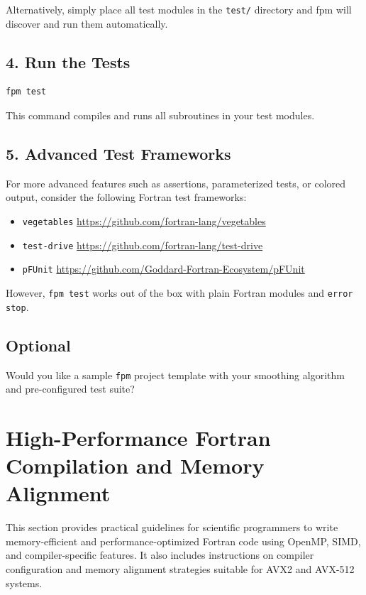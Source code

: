 \documentclass{article}
\begin{document}
Alternatively, simply place all test modules in the \texttt{test/} directory and fpm will discover and run them automatically.

\subsection{4. Run the Tests}

\begin{verbatim}
fpm test
\end{verbatim}

This command compiles and runs all subroutines in your test modules.

\subsection{5. Advanced Test Frameworks}

For more advanced features such as assertions, parameterized tests, or colored output, consider the following Fortran test frameworks:

\begin{itemize}
  \item \texttt{vegetables} \url{https://github.com/fortran-lang/vegetables}
  \item \texttt{test-drive} \url{https://github.com/fortran-lang/test-drive}
  \item \texttt{pFUnit} \url{https://github.com/Goddard-Fortran-Ecosystem/pFUnit}
\end{itemize}

However, \texttt{fpm test} works out of the box with plain Fortran modules and \texttt{error stop}.

\subsection{Optional}
Would you like a sample \texttt{fpm} project template with your smoothing algorithm and pre-configured test suite?

\section{High-Performance Fortran Compilation and Memory Alignment}

This section provides practical guidelines for scientific programmers to write memory-efficient and performance-optimized Fortran code using OpenMP, SIMD, and compiler-specific features. It also includes instructions on compiler configuration and memory alignment strategies suitable for AVX2 and AVX-512 systems.
\end{document}
